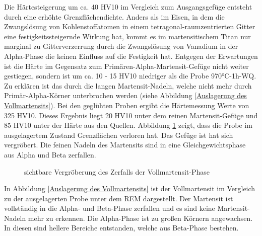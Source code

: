 \documentclass[a4paper, 11pt]{tubsreprt}
\begin{document}
Die Härtesteigerung um ca. 40 HV10 im Vergleich zum Ausgangsgefüge entsteht durch eine erhöhte Grenzflächendichte. Anders als im Eisen, in dem die Zwangslösung von Kohlenstoffatomen in einem tetragonal-raumzentrierten Gitter eine festigkeitssteigernde Wirkung hat, kommt es im martensitischem Titan nur marginal zu Gitterverzerrung durch die Zwangslösung von Vanadium in der Alpha-Phase die keinen Einfluss auf die Festigkeit hat. Entgegen der Erwartungen ist die Härte im Gegensatz zum Primären-Alpha-Martensit-Gefüge nicht weiter gestiegen, sondern ist um ca. 10 - 15 HV10 niedriger als die Probe 970°C-1h-WQ. Zu erklären ist das durch die langen Martensit-Nadeln, welche nicht mehr durch Primär-Alpha-Körner unterbrochen werden (siehe Abbildung \ref{Auslagerung des Vollmartensits}).
Bei den geglühten Proben ergibt die Härtemessung Werte von 325 HV10. Dieses Ergebnis liegt 20 HV10 unter dem reinen Martensit-Gefüge und 85 HV10 unter der Härte aus den Quellen.
Abbildung \ref{vergleich vollmartensit und auslagerung} zeigt, dass die Probe im ausgelagertem Zustand Grenzflächen verloren hat. Das Gefüge ist hat sich vergröbert. Die feinen Nadeln des Martensits sind in eine Gleichgewichtsphase aus Alpha und Beta zerfallen. 
\newpage
\begin{figure}
\caption{sichtbare Vergröberung des Zerfalls der Vollmartensit-Phase}
\label{vergleich vollmartensit und auslagerung}
\end{figure}
In Abbildung \ref{Auslagerung des Vollmartensits} ist der Vollmartensit im Vergleich zu der ausgelagerten Probe unter dem REM dargestellt. Der Martensit ist vollständig in die Alpha- und Beta-Phase zerfallen und es sind keine Martensit-Nadeln mehr zu erkennen. Die Alpha-Phase ist zu großen Körnern angewachsen. In diesen sind hellere Bereiche entstanden, welche aus Beta-Phase bestehen.
\end{document}
